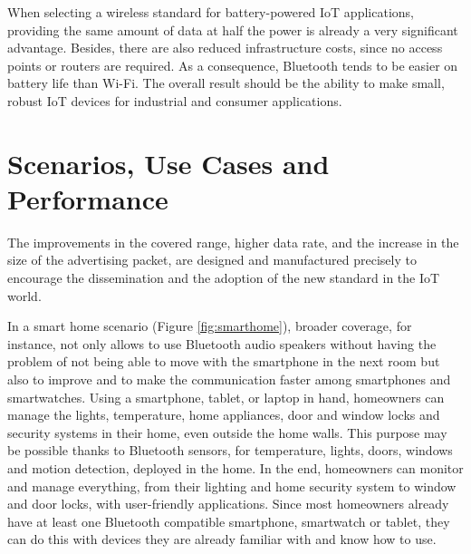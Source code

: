 \documentclass[12pt, draftclsnofoot, onecolumn]{IEEEtran}
\begin{document}
When selecting a wireless standard for battery-powered IoT applications, providing the same amount of data at half the power is already a very significant advantage. Besides, there are also reduced infrastructure costs, since no access points or routers are required. As a consequence, Bluetooth tends to be easier on battery life than Wi-Fi. The overall result should be the ability to make small, robust IoT devices for industrial and consumer applications.

\section{Scenarios, Use Cases and Performance}
\label{sec:performance}

The improvements in the covered range, higher data rate, and the increase in the size of the advertising packet, are designed and manufactured precisely to encourage the dissemination and the adoption of the new standard in the IoT world.

In a smart home scenario (Figure \ref{fig:smarthome}), broader coverage, for instance, not only allows to use Bluetooth audio speakers without having the problem of not being able to move with the smartphone in the next room but also to improve and to make the communication faster among smartphones and smartwatches. Using a smartphone, tablet, or laptop in hand, homeowners can manage the lights, temperature, home appliances, door and window locks and security systems in their home, even outside the home walls. This purpose may be possible thanks to Bluetooth sensors, for temperature, lights, doors, windows and motion detection, deployed in the home. In the end, homeowners can monitor and manage everything, from their lighting and home security system to window and door locks, with user-friendly applications. Since most homeowners already have at least one Bluetooth compatible smartphone, smartwatch or tablet, they can do this with devices they are already familiar with and know how to use.

\end{document}
